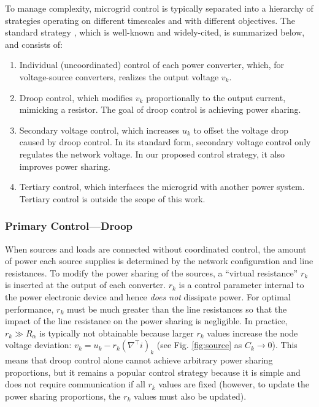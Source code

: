 \documentclass[letterpaper, 10 pt, conference]{ieeeconf}
\begin{document}
To manage complexity, microgrid control is typically separated into a hierarchy of strategies operating on different timescales and with different objectives. The standard strategy \cite{GuerreroHierarchy}, which is well-known and widely-cited, is summarized below, and consists of:
\begin{enumerate}
    \item Individual (uncoordinated) control of each power converter, which, for voltage-source converters, realizes the output voltage $v_k$.
    \item Droop control, which modifies $v_k$ proportionally to the output current, mimicking a resistor. The goal of droop control is achieving power sharing.
    \item Secondary voltage control, which increases $u_k$ to offset the voltage drop caused by droop control. In its standard form, secondary voltage control only regulates the network voltage. In our proposed control strategy, it also improves power sharing.
    \item Tertiary control, which interfaces the microgrid with another power system. Tertiary control is outside the scope of this work.
\end{enumerate}

\subsubsection{Primary Control---Droop}\label{sec:droop}

When sources and loads are connected without coordinated control, the amount of power each source supplies is determined by the network configuration and line resistances. To modify the power sharing of the sources, a ``virtual resistance'' $r_k$ is inserted at the output of each converter. $r_k$ is a control parameter internal to the power electronic device and hence \textit{does not} dissipate power. For optimal performance, $r_k$ must be much greater than the line resistances so that the impact of the line resistance on the power sharing is negligible. In practice, $r_k \gg R_{\alpha}$ is typically not obtainable because larger $r_k$ values increase the node voltage deviation: $v_k = u_k - r_k (\nabla^\top i)_k$ (see Fig. \ref{fig:source} as $C_k \to 0$). This means that droop control alone cannot achieve arbitrary power sharing proportions, but it remains a popular control strategy because it is simple and does not require communication if all $r_k$ values are fixed (however, to update the power sharing proportions, the $r_k$ values must also be updated).
\end{document}
